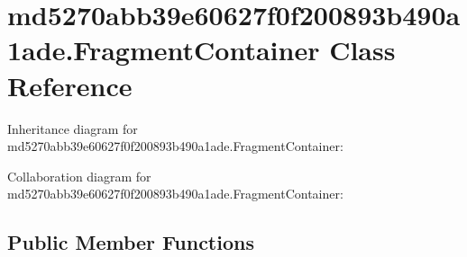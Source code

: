 \hypertarget{classmd5270abb39e60627f0f200893b490a1ade_1_1_fragment_container}{}\section{md5270abb39e60627f0f200893b490a1ade.\+Fragment\+Container Class Reference}
\label{classmd5270abb39e60627f0f200893b490a1ade_1_1_fragment_container}


Inheritance diagram for md5270abb39e60627f0f200893b490a1ade.\+Fragment\+Container\+:


Collaboration diagram for md5270abb39e60627f0f200893b490a1ade.\+Fragment\+Container\+:
\subsection*{Public Member Functions}
